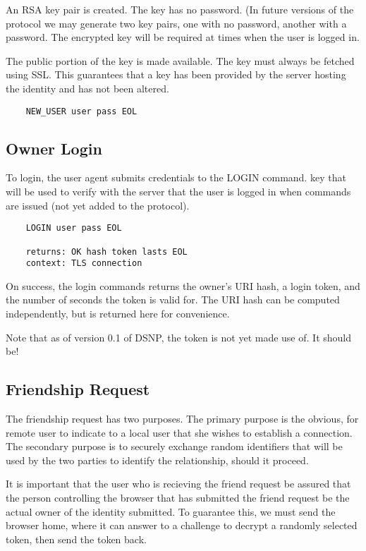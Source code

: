 \documentclass[letterpaper,11pt,oneside]{article}
\begin{document}
An RSA key pair is created. The key has no password. (In future versions of the
protocol we may generate two key pairs, one with no password,  another with a
password. The encrypted key will be required at times when the user is logged
in.

The public portion of the key is made available. The key must always be fetched
using SSL. This guarantees that a key has been provided by the server hosting
the identity and has not been altered.

\vspace{10pt}
\begin{verbatim}
    NEW_USER user pass EOL
\end{verbatim}

\subsection{Owner Login}

To login, the user agent submits credentials to the LOGIN command. key that
will be used to verify with the server that the user is logged in when commands
are issued (not yet added to the protocol).

\vspace{10pt}
\begin{verbatim}
    LOGIN user pass EOL

    returns: OK hash token lasts EOL
    context: TLS connection
\end{verbatim}
\vspace{10pt}

On success, the login commands returns the owner's URI hash, a login token, and
the number of seconds the token is valid for. The URI hash can be computed
independently, but is returned here for convenience.

Note that as of version 0.1 of DSNP, the token is not yet made use of. It
should be!

\subsection{Friendship Request}

The friendship request has two purposes. The primary purpose is the obvious,
for remote user to indicate to a local user that she wishes to establish a
connection. The secondary purpose is to securely exchange random identifiers
that will be used by the two parties to identify the relationship, should it
proceed.

It is important that the user who is recieving the friend request be assured
that the person controlling the browser that has submitted the friend request
be the actual owner of the identity submitted. To guarantee this, we must send
the browser home, where it can answer to a challenge to decrypt a randomly
selected token, then send the token back.
\end{document}
